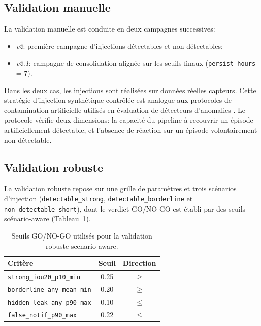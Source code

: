 \subsection{Validation manuelle}
La validation manuelle est conduite en deux campagnes successives:
\begin{itemize}
    \item \textit{v2}: première campagne d'injections détectables et non-détectables;
    \item \textit{v2.1}: campagne de consolidation alignée sur les seuils finaux
    (\texttt{persist\_hours} = 7).
\end{itemize}
Dans les deux cas, les injections sont réalisées sur données réelles capteurs. Cette stratégie
d'injection synthétique contrôlée est analogue aux protocoles de contamination artificielle
utilisés en évaluation de détecteurs d'anomalies \citep{emmott2015metaanalysis,chandola2009anomaly,zimek2015subsampling}.
Le protocole vérifie deux dimensions: la capacité du pipeline à recouvrir un épisode
artificiellement détectable, et l'absence de réaction sur un épisode volontairement non
détectable.

\subsection{Validation robuste}
La validation robuste repose sur une grille de paramètres et trois scénarios d'injection (\texttt{detectable\_\allowbreak strong}, \texttt{detectable\_\allowbreak borderline} et \texttt{non\_\allowbreak detectable\_\allowbreak short}), dont le verdict GO/NO-GO est établi par des seuils scénario-aware (Tableau~\ref{tab:go_thresholds}).

\begin{table}[H]
    \centering
    \caption{Seuils GO/NO-GO utilisés pour la validation robuste scenario-aware.}
    \label{tab:go_thresholds}
    \begin{tabular}{lcc}
        \toprule
        \textbf{Critère}                         & \textbf{Seuil}  & \textbf{Direction} \\
        \midrule
        \texttt{strong\_iou20\_p10\_min}         & 0.25            & $\geq$ \\
        \texttt{borderline\_any\_mean\_min}      & 0.20            & $\geq$ \\
        \texttt{hidden\_leak\_any\_p90\_max}     & 0.10            & $\leq$ \\
        \texttt{false\_notif\_p90\_max}          & 0.22            & $\leq$ \\
        \bottomrule
    \end{tabular}
\end{table}


